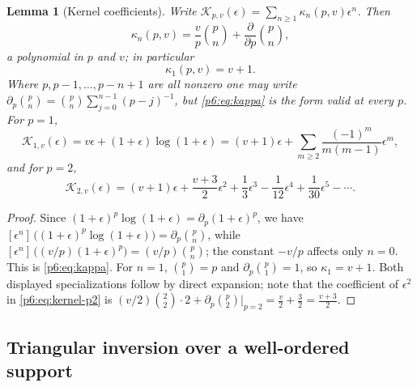 \documentclass[11pt,a4paper,oneside]{book}
\theoremstyle{plain}
\newtheorem{lemma}[theorem]{Lemma}
\theoremstyle{definition}
\theoremstyle{remark}
\newcommand{\Coef}[1]{[#1]\,}
\begin{document}
\begin{lemma}[Kernel coefficients]\label{p6:lem:kernel-coefficients}
Write $\mathcal{K}_{p,v}(\epsilon)=\sum_{n\ge1}\kappa_n(p,v)\epsilon^{n}$.  Then
\begin{equation}\label{p6:eq:kappa}
 \kappa_n(p,v)=\frac vp\binom pn+\frac{\partial}{\partial p}\binom pn,
\end{equation}
a polynomial in $p$ and $v$; in particular
\begin{equation}\label{p6:eq:kappa1}
 \kappa_1(p,v)=v+1 .
\end{equation}
Where $p,p-1,\dots,p-n+1$ are all nonzero one may write
$\partial_p\binom pn=\binom pn\sum_{j=0}^{n-1}(p-j)^{-1}$, but
\eqref{p6:eq:kappa} is the form valid at every $p$.  For $p=1$,
\begin{equation}\label{p6:eq:kernel-p1}
 \mathcal{K}_{1,v}(\epsilon)=v\epsilon+(1+\epsilon)\log(1+\epsilon)
 =(v+1)\epsilon+\sum_{m\ge2}\frac{(-1)^{m}}{m(m-1)}\epsilon^{m},
\end{equation}
and for $p=2$,
\begin{equation}\label{p6:eq:kernel-p2}
 \mathcal{K}_{2,v}(\epsilon)
 =(v+1)\epsilon+\frac{v+3}2\epsilon^{2}
 +\frac13\epsilon^{3}-\frac1{12}\epsilon^{4}
 +\frac1{30}\epsilon^{5}-\cdots .
\end{equation}
\end{lemma}

\begin{proof}
Since $(1+\epsilon)^{p}\log(1+\epsilon)=\partial_p(1+\epsilon)^{p}$, we have
$\Coef{\epsilon^{n}}\bigl((1+\epsilon)^{p}\log(1+\epsilon)\bigr)
=\partial_p\binom pn$, while
$\Coef{\epsilon^{n}}\bigl((v/p)(1+\epsilon)^{p}\bigr)=(v/p)\binom pn$; the
constant $-v/p$ affects only $n=0$.  This is \eqref{p6:eq:kappa}.  For $n=1$,
$\binom p1=p$ and $\partial_p\binom p1=1$, so $\kappa_1=v+1$.  Both
displayed specializations follow by direct expansion; note that the
coefficient of $\epsilon^2$ in \eqref{p6:eq:kernel-p2} is
$(v/2)\binom22\cdot2+\partial_p\binom p2|_{p=2}
=\tfrac v2+\tfrac32=\tfrac{v+3}2$.
\end{proof}

\subsection{Triangular inversion over a well-ordered support}
\end{document}
